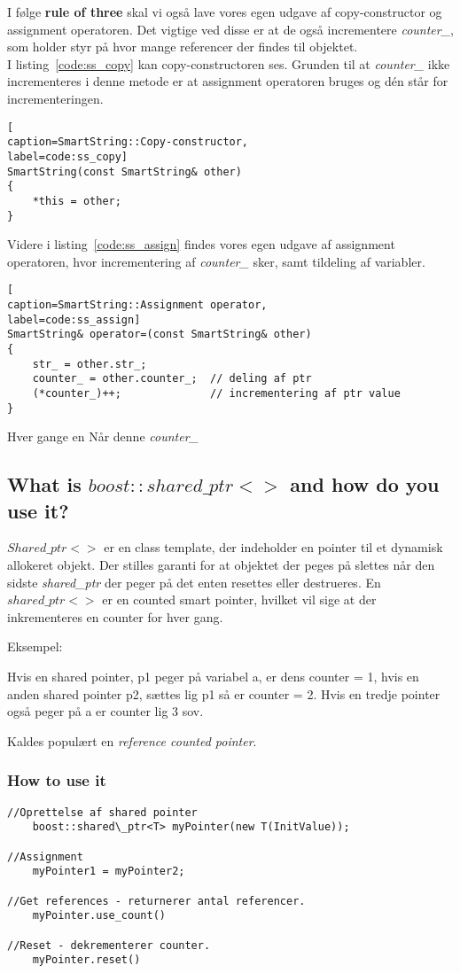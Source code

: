 I følge \textbf{rule of three} skal vi også lave vores egen udgave af copy-constructor og assignment operatoren.
Det vigtige ved disse er at de også incrementere \textit{counter\_}, som holder styr på hvor mange referencer der findes til objektet.\\

I listing~\ref{code:ss_copy} kan copy-constructoren ses. Grunden til at \textit{counter\_} ikke incrementeres i denne metode er at assignment operatoren bruges og dén står for incrementeringen. 

\begin{lstlisting}[
caption=SmartString::Copy-constructor, 
label=code:ss_copy]
SmartString(const SmartString& other)
{
	*this = other;
}
\end{lstlisting}

Videre i listing~\ref{code:ss_assign} findes vores egen udgave af assignment operatoren, hvor incrementering af \textit{counter\_} sker, samt tildeling af variabler.

\begin{lstlisting}[
caption=SmartString::Assignment operator,
label=code:ss_assign]
SmartString& operator=(const SmartString& other)
{
	str_ = other.str_;
	counter_ = other.counter_;	// deling af ptr
	(*counter_)++;				// incrementering af ptr value
}
\end{lstlisting}

Hver gange en 
Når denne \textit{counter\_} 

\subsection{What is $boost::shared\_ptr<>$ and how do you use it?}

$Shared\_ptr<>$ er en class template, der indeholder en pointer til et dynamisk allokeret objekt. Der stilles garanti for at objektet der peges på slettes når den sidste \textit{shared\_ptr} der peger på det enten resettes eller destrueres. En $shared\_ptr<>$ er en counted smart pointer, hvilket vil sige at der inkrementeres en counter for hver gang.

Eksempel:

Hvis en shared pointer, p1 peger på variabel a, er dens counter = 1, hvis en anden shared pointer p2, sættes lig p1 så er counter = 2. Hvis en tredje pointer også peger på a er counter lig 3 sov.

Kaldes populært en \textit{reference counted pointer}.

\subsubsection{How to use it}
\begin{lstlisting}[caption=Eksempel på brugen af en shared pointer, label=usOfSharedPtr]
//Oprettelse af shared pointer
	boost::shared\_ptr<T> myPointer(new T(InitValue));

//Assignment
	myPointer1 = myPointer2;
	
//Get references - returnerer antal referencer.
	myPointer.use_count()

//Reset - dekrementerer counter.
	myPointer.reset()
\end{lstlisting}

